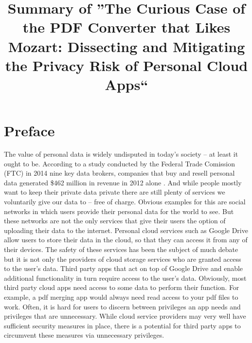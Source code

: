 \documentclass[11pt,twocolumn,a4paper,DIV=calc]{scrartcl}
\begin{document}
\title{Summary of ''The Curious Case of the PDF Converter that Likes Mozart: Dissecting and Mitigating the Privacy Risk of Personal Cloud Apps``}
\date{}
\maketitle

\section{Preface}
The value of personal data is widely undisputed in today’s society – at least it ought to be. According to a study conducted by the Federal Trade Comission (FTC) in 2014 nine key data brokers, companies that buy and resell personal data generated \$462 million in revenue in 2012 alone \cite{FTCStudy}. And while people mostly want to keep their private data private \cite{WorthOfData} there are still plenty of services we voluntarily give our data to – free of charge. Obvious examples for this are social networks in which users provide their personal data for the world to see. But these networks are not the only services that give their users the option of uploading their data to the internet. Personal cloud services such as Google Drive allow users to store their data in the cloud, so that they can access it from any of their devices. The safety of these services has been the subject of much debate \cite{CloudSecurity} but it is not only the providers of cloud storage services who are granted access to the user's data. Third party apps that act on top of Google Drive and enable additional functionality in turn require access to the user’s data. Obviously, most third party cloud apps need access to some data to perform their function. For example, a pdf merging app would always need read access to your pdf files to work. Often, it is hard for users to discern between privileges an app needs and privileges that are unnecessary. While cloud service providers may very well have sufficient security measures in place, there is a potential for third party apps to circumvent these measures via unnecessary privileges.
\end{document}
